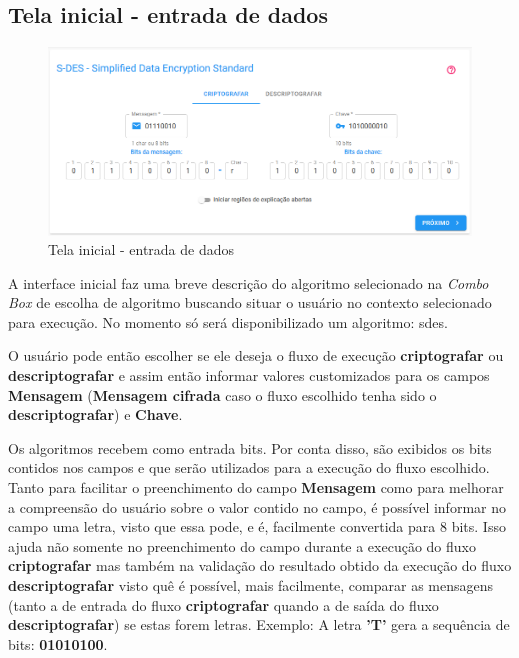 \subsection{Tela inicial - entrada de dados}

\begin{figure}[H]
    \centering
    \caption{Tela inicial - entrada de dados}
    \includegraphics[width=1\linewidth]{UI/UIMain.png}
\end{figure}

A interface inicial faz uma breve descrição do algoritmo selecionado na \textit{Combo Box} de escolha de algoritmo buscando situar o usuário no contexto selecionado para execução. No momento só será disponibilizado um algoritmo: \acrfull{sdes}.

O usuário pode então escolher se ele deseja o fluxo de execução \textbf{criptografar} ou \textbf{descriptografar} e assim então informar valores customizados para os campos \textbf{Mensagem} (\textbf{Mensagem cifrada} caso o fluxo escolhido tenha sido o \textbf{descriptografar}) e \textbf{Chave}.

Os algoritmos recebem como entrada bits. Por conta disso, são exibidos os bits contidos nos campos e que serão utilizados para a execução do fluxo escolhido. Tanto para facilitar o preenchimento do campo \textbf{Mensagem} como para melhorar a compreensão do usuário sobre o valor contido no campo, é possível informar no campo uma letra, visto que essa pode, e é, facilmente convertida para 8 bits. Isso ajuda não somente no preenchimento do campo durante a execução do fluxo \textbf{criptografar} mas também na validação do resultado obtido da execução do fluxo \textbf{descriptografar} visto quê é possível, mais facilmente, comparar as mensagens (tanto a de entrada do fluxo \textbf{criptografar} quando a de saída do fluxo \textbf{descriptografar}) se estas forem letras. Exemplo: A letra \textbf{'T'} gera a sequência de bits: \textbf{01010100}.

